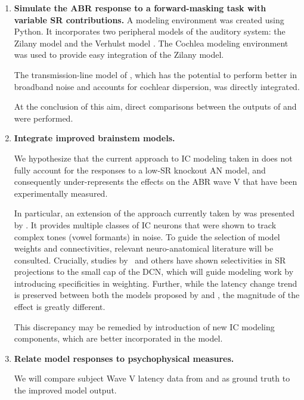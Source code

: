 \begin{enumerate}
	\item \textbf{Simulate the ABR response to a forward-masking task with variable SR contributions.}
	A modeling environment was created using Python.  It incorporates two peripheral models of the auditory system: the Zilany model \citep{Zilany2014Updated} and the Verhulst model \citep{Verhulst2015Functional}.  The Cochlea modeling environment \citep{Rudnicki2014Cochlea} was used to provide easy integration of the Zilany model.

	The transmission-line model of  \cite{Verhulst2015Functional}, which has the potential to perform better in broadband noise and accounts for cochlear dispersion, was directly integrated.

	At the conclusion of this aim, direct comparisons between the outputs of \cite{Zilany2014Updated} and \cite{Verhulst2015Functional} were performed.

	\item \textbf{Integrate improved brainstem models.}  

	We hypothesize that the current approach to IC modeling taken in \cite{Verhulst2015Functional} does not fully account for the responses to a low-SR knockout AN model, and consequently under-represents the effects on the ABR wave V that have been experimentally measured.  

	In particular, an extension of the approach currently taken by \cite{Verhulst2015Functional} was presented by \cite{Carney2015Speech}.  It provides multiple classes of IC neurons that were shown to track complex tones (vowel formants) in noise.  To guide the selection of model weights and connectivities, relevant neuro-anatomical literature will be consulted.  Crucially, studies by~\cite{Ryugo2008Projections} and others have shown selectivities in SR projections to the small cap of the DCN, which will guide modeling work by introducing specificities in weighting. Further, while the latency change trend is preserved between both the models proposed by \citeauthor{Zilany2014Updated} and \citeauthor{Verhulst2015Functional}, the magnitude of the effect is greatly different.  

	This discrepancy may be remedied by introduction of new IC modeling components, which are better incorporated in the \cite{Zilany2014Updated} model.
	
	\item \textbf{Relate model responses to psychophysical measures.}  

	We will compare subject Wave V latency data from \citeauthor{Mehraei2015Individual} and \citeauthor{Mehraei2016Auditory} as ground truth to the improved model output.
	
	
\end{enumerate}